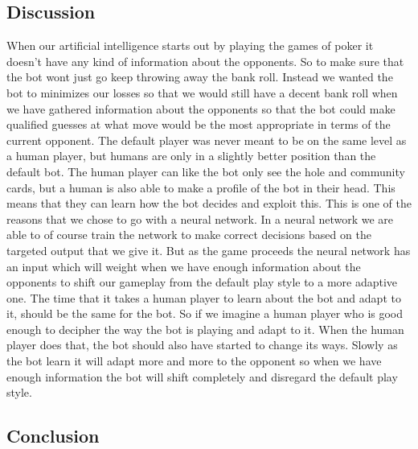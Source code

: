 \subsection{Discussion}
When our artificial intelligence starts out by playing the games of poker it doesn't have any kind of information about the opponents. So to make sure that the bot wont just go keep throwing away the bank roll. Instead we wanted the bot to minimizes our losses so that we would still have a decent bank roll when we have gathered information about the opponents so that the bot could make qualified guesses at what move would be the most appropriate in terms of the current opponent. The default player was never meant to be on the same level as a human player, but humans are only in a slightly better position than the default bot. The human player can like the bot only see the hole and community cards, but a human is also able to make a profile of the bot in their head. This means that they can learn how the bot decides and exploit this. 
This is one of the reasons that we chose to go with a neural network. In a neural network we are able to of course train the network to make correct decisions based on the targeted output that we give it.
But as the game proceeds the neural network has an input which will weight when we have enough information about the opponents to shift our gameplay from the default play style to a more adaptive one.
The time that it takes a human player to learn about the bot and adapt to it, should be the same for the bot. So if we imagine a human player who is good enough to decipher the way the bot is playing and adapt to it. When the human player does that, the bot should also have started to change its ways. Slowly as the bot learn it will adapt more and more to the opponent so when we have enough information the bot will shift completely and disregard the default play style.
\subsection{Conclusion}